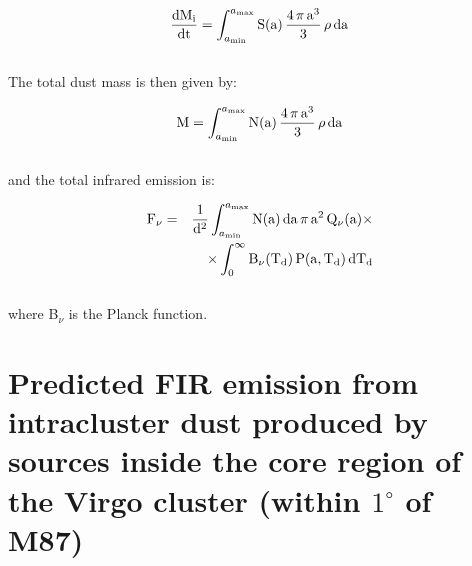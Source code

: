 \documentclass[]{aa}
\begin{document}
\begin{eqnarray}
\frac{\rm dM_i}{\rm dt} = \int_{a_{\rm min}}^{a_{\rm max}} {\rm S(a)}\,
\frac{4\,{\pi}\,{\rm a}^3}{3}\,{\rho}\,{\rm da}
\end{eqnarray}
\\

The total dust mass is then given by:

\begin{eqnarray}
{\rm M}=\int_{a_{\rm min}}^{a_{\rm max}}{\rm N}({\rm a})\,\frac{4\,{\pi}\,
{\rm a}^3}{3}\,{\rho}\,{\rm da}
\end{eqnarray}
\\
and the total infrared emission is:

\begin{eqnarray}
{\rm F}_{\nu} & = & \frac{1} {{\rm d}^2}\int_{a_{\rm min}}^{a_{\rm max}} 
{\rm N}({\rm a})\,{\rm da}\,{\pi}\,{\rm a}^2\,{\rm Q}_{\nu}({\rm a})
\times  \nonumber \\
& & \times\int_0^{\infty}{\rm B}_{\nu}({\rm T}_{\rm d})\,{\rm P}({\rm a},
{\rm T}_{\rm d})\,{\rm dT}_{\rm d}  
\end{eqnarray}
\\
where B$_{\nu}$ is the Planck function.


\section{Predicted FIR emission from intracluster dust produced by sources 
inside the core region of the Virgo cluster (within $1^{\circ}$ of M87)}
\end{document}
